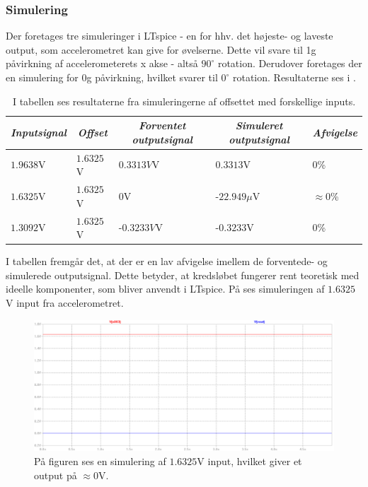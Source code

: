 \subsubsection{Simulering}
Der foretages tre simuleringer i LTspice - en for hhv. det højeste- og laveste output, som accelerometret kan give for øvelserne. Dette vil svare til 1g påvirkning af accelerometerets x akse - altså $90^{\circ}$ rotation. Derudover foretages der en simulering for 0g påvirkning, hvilket svarer til $0^{\circ}$ rotation. Resultaterne ses i .
\begin{table}[H]
	\centering
	\begin{tabular}{|l|l|l|l|l|}
		\hline
		\multicolumn{1}{|c|}{\textit{Inputsignal}} & \multicolumn{1}{c|}{\textit{Offset}} & \multicolumn{1}{c|}{\textit{Forventet outputsignal}} & \multicolumn{1}{c|}{\textit{Simuleret outputsignal}} & \multicolumn{1}{c|}{\textit{Afvigelse}} \\ \hline
		$1.9638$V     & $1.6325$V    & $0.3313V$V    & $0.3313$V       & $0$\%              \\ \hline
		$1.6325$V     & $1.6325$V    & $0$V          & -$22.949\mu$V   & $\approx 0$\%      \\ \hline
		$1.3092$V     & $1.6325$V    & -$0.3233V$V   & -$0.3233$V      & $0$\%                \\ \hline
	\end{tabular}
	\caption{I tabellen ses resultaterne fra simuleringerne af offsettet med forskellige inputs.}
	\label{Tab:offset_sim}
\end{table}
\noindent I tabellen fremgår det, at der er en lav afvigelse imellem de forventede- og simulerede outputsignal. Dette betyder, at kredsløbet fungerer rent teoretisk med ideelle komponenter, som bliver anvendt i LTspice. På  ses simuleringen af $1.6325$V input fra accelerometret.
 
\begin{figure}[H]
\centering
\includegraphics[scale=0.3]{figures/cProblemloesning/Offset_simulering.png}
\caption{På figuren ses en simulering af $1.6325$V input, hvilket giver et output på $\approx 0$V.}
\label{fig:Offset_simulering}
\end{figure}

